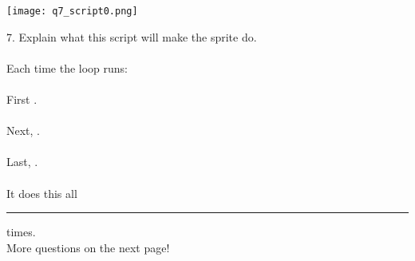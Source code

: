 \begin{center}
\texttt{[image: q7\_script0.png]}
\end{center}
7. Explain what this script will make the sprite do. \\ \\
Each time the loop runs: \\ \\
\indent First \hrulefill. \\ \\
\indent Next, \hrulefill. \\ \\
\indent Last, \hrulefill. \\ \\
It does this all \rule{1cm}{0.5pt} times. \\

\noindent More questions on the next page! \dotfill \\
\newpage
